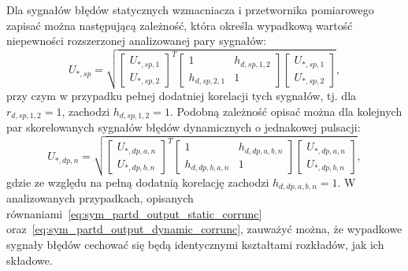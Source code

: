 Dla sygnałów błędów statycznych wzmacniacza i przetwornika pomiarowego zapisać można następującą zależność, która określa wypadkową wartość niepewności rozszerzonej analizowanej pary sygnałów:
\begin{equation}
U_{*,sp} = \sqrt{
\begin{bmatrix}
U_{*,sp,1} \\ U_{*,sp,2}
\end{bmatrix}^{T}
\begin{bmatrix}
1 & h_{d,sp,1,2} \\
h_{d,sp,2,1} & 1
\end{bmatrix}
\begin{bmatrix}
U_{*,sp,1} \\ U_{*,sp,2}
\end{bmatrix}}
\label{eq:sym_partd_output_static_corrunc},
\end{equation}
przy czym w przypadku pełnej dodatniej korelacji tych sygnałów, tj. dla $r_{d,sp,1,2} = 1$, zachodzi $h_{d,sp,1,2} = 1$. Podobną zależność opisać można dla kolejnych par skorelowanych sygnałów błędów dynamicznych o jednakowej pulsacji:
\begin{equation}
U_{*,dp,n} = \sqrt{
\begin{bmatrix}
U_{*,dp,a,n} \\ U_{*,dp,b,n}
\end{bmatrix}^{T}
\begin{bmatrix}
1 & h_{d,dp,a,b,n} \\
h_{d,dp,b,a,n} & 1
\end{bmatrix}
\begin{bmatrix}
U_{*,dp,a,n} \\ U_{*,dp,b,n}
\end{bmatrix}}
\label{eq:sym_partd_output_dynamic_corrunc},
\end{equation}
gdzie ze względu na pełną dodatnią korelację zachodzi $h_{d,dp,a,b,n} = 1$. W analizowanych przypadkach, opisanych równaniami~\eqref{eq:sym_partd_output_static_corrunc} oraz~\eqref{eq:sym_partd_output_dynamic_corrunc}, zauważyć można, że wypadkowe sygnały błędów cechować się będą identycznymi kształtami rozkładów, jak ich składowe.

